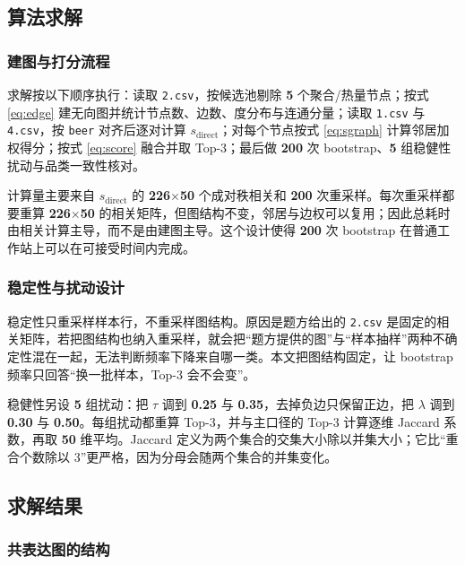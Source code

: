 \subsection{算法求解}

\subsubsection{建图与打分流程}

求解按以下顺序执行：读取 \texttt{2.csv}，按候选池剔除 \textbf{5} 个聚合/热量节点；按式 \eqref{eq:edge} 建无向图并统计节点数、边数、度分布与连通分量；读取 \texttt{1.csv} 与 \texttt{4.csv}，按 \texttt{beer} 对齐后逐对计算 $s_{\mathrm{direct}}$；对每个节点按式 \eqref{eq:sgraph} 计算邻居加权得分；按式 \eqref{eq:score} 融合并取 Top-3；最后做 \textbf{200} 次 bootstrap、\textbf{5} 组稳健性扰动与品类一致性核对。

计算量主要来自 $s_{\mathrm{direct}}$ 的 \textbf{226}$\times$\textbf{50} 个成对秩相关和 \textbf{200} 次重采样。每次重采样都要重算 \textbf{226}$\times$\textbf{50} 的相关矩阵，但图结构不变，邻居与边权可以复用；因此总耗时由相关计算主导，而不是由建图主导。这个设计使得 \textbf{200} 次 bootstrap 在普通工作站上可以在可接受时间内完成。

\subsubsection{稳定性与扰动设计}

稳定性只重采样样本行，不重采样图结构。原因是题方给出的 \texttt{2.csv} 是固定的相关矩阵，若把图结构也纳入重采样，就会把“题方提供的图”与“样本抽样”两种不确定性混在一起，无法判断频率下降来自哪一类。本文把图结构固定，让 bootstrap 频率只回答“换一批样本，Top-3 会不会变”。

稳健性另设 \textbf{5} 组扰动：把 $\tau$ 调到 \textbf{0.25} 与 \textbf{0.35}，去掉负边只保留正边，把 $\lambda$ 调到 \textbf{0.30} 与 \textbf{0.50}。每组扰动都重算 Top-3，并与主口径的 Top-3 计算逐维 Jaccard 系数，再取 \textbf{50} 维平均。Jaccard 定义为两个集合的交集大小除以并集大小；它比“重合个数除以 3”更严格，因为分母会随两个集合的并集变化。

\subsection{求解结果}

\subsubsection{共表达图的结构}

